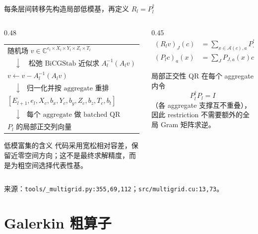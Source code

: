 \documentclass[UTF8,aspectratio=169,11pt]{ctexbeamer}
\newcommand{\source}[1]{%
  \vspace{-0.08em}\par{\raggedright\scriptsize\color{muted}来源：#1\par}}
\newcommand{\src}[1]{\nolinkurl{#1}}
\begin{document}
\begin{frame}[t]{每条层间转移先构造局部低模基，再定义 $R_l=P_l^\dagger$}
  \begin{columns}[T,totalwidth=\textwidth]
    \begin{column}{0.48\textwidth}
      \begin{tabular}{@{}l@{}}
        $\text{随机场 }v\in\mathbb{C}^{e_l\times X_l\times Y_l\times Z_l\times T_l}$ \\
        $\quad\downarrow\quad\text{松弛 BiCGStab 近似求 }A_l^{-1}(A_lv)$ \\
        $v\leftarrow v-A_l^{-1}(A_lv)$ \\
        $\quad\downarrow\quad\text{归一化并按 aggregate 重排}$ \\
        $[E_{l+1},e_l,X_c,b_x,Y_c,b_y,Z_c,b_z,T_c,b_t]$ \\
        $\quad\downarrow\quad\text{每个 aggregate 做 batched QR}$ \\
        $P_l\text{ 的局部正交列向量}$
      \end{tabular}
      \vspace{0.10em}
      \begin{block}{低模富集的含义}
        \footnotesize
        代码采用宽松相对容差，保留近零空间方向；这不是最终求解精度，而是为粗空间选择代表性基。
      \end{block}
    \end{column}
    \begin{column}{0.45\textwidth}
      \begin{align*}
        (R_lv)_J(c)&=\sum_{x\in\mathcal A(c),a}
          P_{J,a}^*(x)v_a(x),\\
        (P_lc)_a(x)&=\sum_JP_{J,a}(x)c_J(c).
      \end{align*}
      \begin{block}{局部正交性}
        \small
        QR 在每个 aggregate 内令
        \[
        P_l^\dagger P_l=I
        \]
        （各 aggregate 支撑互不重叠），因此 restriction 不需要额外的全局 Gram 矩阵求逆。
      \end{block}
    \end{column}
  \end{columns}
  \source{\src{tools/_multigrid.py:355,69,112}；\src{src/multigrid.cu:13,73}。}
\end{frame}

\section{Galerkin 粗算子}
\end{document}

